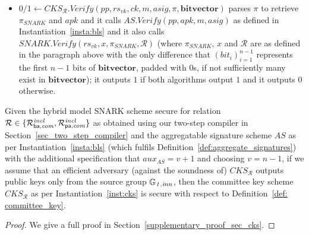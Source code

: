 \begin{construction}
\begin{itemize}
\item $0/1 \leftarrow \mathit{CKS_{\mathcal{R}}.Verify}(\mathit{pp}, \mathit{rs}_{\mathit{vk}}, \mathit{ck}, m, \mathit{asig}, \pi, \mathbf{bitvector})$ 
parses $\pi$ to retrieve $\pi_{\mathit{SNARK}}$ and $\mathit{apk}$ and it calls $\mathit{AS.Verify(\mathit{pp}, \mathit{apk}, m, \mathit{asig})}$ 
as defined in Instantiation~\ref{insta:bls} and it also calls \\ $\mathit{SNARK.Verify}(\mathit{rs_{vk}}, x, \pi_{\mathit{SNARK}}, \mathcal{R})$ 
(where $\pi_{\mathit{SNARK}}$, $x$ and $\mathcal{R}$ are as defined in the paragraph above with the only difference that $(\mathit{bit_i})_{i=1}^{n-1}$ 
represents the first $n-1$ bits of $\mathbf{bitvector}$, padded with $0$s, if not sufficiently many exist in $\mathbf{bitvector}$); 
it outputs $1$ if both algorithms output $1$ and it outputs $0$ otherwise.
\end{itemize}
\end{construction}

\begin{theorem}Given the hybrid model SNARK scheme secure for relation $\mathcal{R} \in \{ \mathcal{R}^{\mathit{incl}}_{\mathsf{ba},\mathit{com}}, \mathcal{R}^{\mathit{incl}}_{\mathsf{pa},\mathit{com}}\}$ as 
obtained using our two-step compiler in Section~\ref{sec_two_step_compiler} and the aggregatable signature scheme $\mathit{AS}$ 
                     as per Instantiation~\ref{insta:bls} (which fulfils Definition~\ref{def:aggregate_signatures}) with the additional 
                     specification that $\mathit{aux}_{\mathit{AS}} = v+1$ and choosing $v = n-1$, 
if we assume that an efficient adversary (against the soundness of) $\mathit{CKS}_{\mathcal{R}}$ outputs public keys only from the source group $\mathbb{G}_{\mathit{1,inn}}$,  
then the committee key scheme $\mathit{CKS}_{\mathcal{R}}$ as per Instantiation~\ref{inst:cks} is secure with respect to Definition~\ref{def: committee_key}.
\end{theorem}
\begin{proof} We give a full proof in Section~\ref{supplementary_proof_sec_cks}. 
\end{proof}